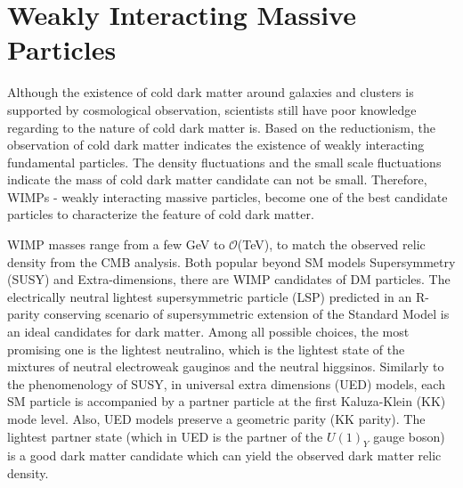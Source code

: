 \section{Weakly Interacting Massive Particles}
\label{sec:dms2}
\par Although the existence of cold dark matter around galaxies and clusters is supported by cosmological observation, scientists still have poor knowledge regarding to the nature of cold dark matter is. Based on the reductionism, the observation of cold dark matter indicates the existence of weakly interacting fundamental particles. The density fluctuations and the small scale fluctuations indicate the mass of cold dark matter candidate can not be small. Therefore, WIMPs - weakly interacting massive particles, become one of the best candidate particles to characterize the feature of cold dark matter.

\par WIMP masses range from a few GeV to $\mathcal{O}$(TeV), to match the observed relic density from the CMB analysis. Both popular beyond SM models Supersymmetry (SUSY) and Extra-dimensions, there are WIMP candidates of DM particles. The electrically neutral lightest supersymmetric particle (LSP) predicted in an R-parity conserving scenario of supersymmetric extension of the Standard Model is an ideal candidates for dark matter. Among all possible choices, the most promising one is the lightest neutralino, which is the lightest state of the mixtures of neutral electroweak gauginos and the neutral higgsinos\cite{Feng:2010gw}. Similarly to the phenomenology of SUSY, in universal extra dimensions (UED) models, each SM particle is accompanied by a partner particle at the first Kaluza-Klein (KK) mode level. Also, UED models preserve a geometric parity (KK parity). The lightest partner state (which in UED is the partner of the $U(1)_Y$ gauge boson) is a good dark matter candidate which can yield the observed dark matter relic density\cite{Servant:2002aq}.

